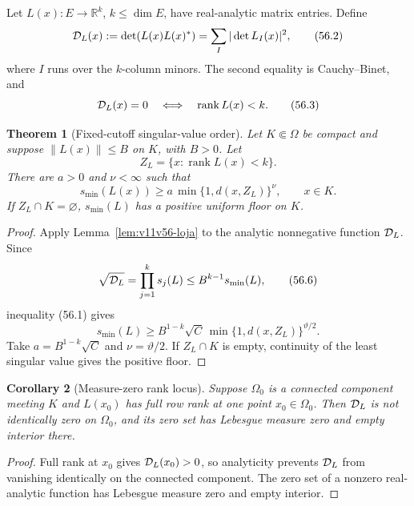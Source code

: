 \documentclass[11pt]{article}
\newtheorem{theorem}{Theorem}[section]
\newtheorem{corollary}[theorem]{Corollary}
\begin{document}
Let \(L(x):E\to\mathbb R^k\), \(k\le\dim E\), have real-analytic matrix
entries.  Define
\[
 {\cal D}_L(x):=\det(L(x)L(x)^*)
              =\sum_{I}|\det L_I(x)|^2,                       \tag{56.2}
\]
where \(I\) runs over the \(k\)-column minors.  The second equality is
Cauchy--Binet, and
\[
                 {\cal D}_L(x)=0
             \quad\Longleftrightarrow\quad\operatorname{rank}L(x)<k.
                                                                  \tag{56.3}
\]

\begin{theorem}[Fixed-cutoff singular-value order]
\label{thm:v11v56-singular-order}
Let \(K\Subset\Omega\) be compact and suppose
\(\lVert L(x)\rVert\le B\) on \(K\), with \(B>0\).  Let
\[
                         Z_L=\{x:\operatorname{rank}L(x)<k\}. \tag{56.4}
\]
There are \(a>0\) and \(\nu<\infty\) such that
\[
                  s_{\min}(L(x))
       \ge a\,\min\{1,d(x,Z_L)\}^{\nu},\qquad x\in K.         \tag{56.5}
\]
If \(Z_L\cap K=\varnothing\), \(s_{\min}(L)\) has a positive uniform
floor on \(K\).
\end{theorem}

\begin{proof}
Apply Lemma~\ref{lem:v11v56-loja} to the analytic nonnegative function
\({\cal D}_L\).  Since
\[
 \sqrt{{\cal D}_L}
       =\prod_{j=1}^ks_j(L)
       \le B^{k-1}s_{\min}(L),                                \tag{56.6}
\]
inequality (56.1) gives
\[
 s_{\min}(L)
 \ge B^{1-k}\sqrt C\,
      \min\{1,d(x,Z_L)\}^{\vartheta/2}.
\]
Take \(a=B^{1-k}\sqrt C\) and \(\nu=\vartheta/2\).
If \(Z_L\cap K\) is empty, continuity of the least singular value gives
the positive floor.
\end{proof}

\begin{corollary}[Measure-zero rank locus]
\label{cor:v11v56-null}
Suppose \(\Omega_0\) is a connected component meeting \(K\) and
\(L(x_0)\) has full row rank at one point \(x_0\in\Omega_0\).
Then \({\cal D}_L\) is not identically zero on \(\Omega_0\), and its
zero set has Lebesgue measure zero and empty interior there.
\end{corollary}

\begin{proof}
Full rank at \(x_0\) gives \({\cal D}_L(x_0)>0\), so analyticity
prevents \({\cal D}_L\) from vanishing identically on the connected
component.  The zero set of a nonzero real-analytic function has
Lebesgue measure zero and empty interior.
\end{proof}
\end{document}
